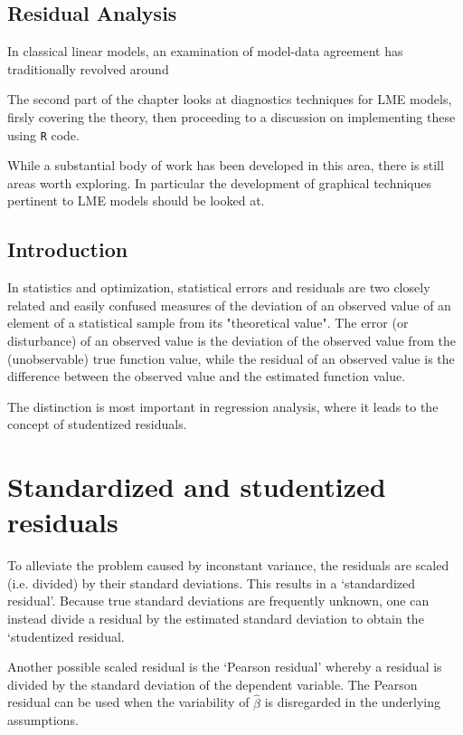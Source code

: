 \documentclass[Main.tex]{subfiles}
\begin{document}
\subsection{Residual Analysis}

In classical linear models, an examination of model-data agreement has traditionally revolved around

The second part of the chapter looks at diagnostics techniques for LME models, firsly covering the theory, then proceeding to a discussion on 
implementing these using \texttt{R} code.

While a substantial body of work has been developed in this area, there is still areas worth exploring. 
In particular the development of graphical techniques pertinent to LME models should be looked at.

	

\subsection{Introduction}
In statistics and optimization, statistical errors and residuals are two closely related and easily confused measures of the deviation of an observed value of an element of a statistical sample from its "theoretical value". The error (or disturbance) of an observed value is the deviation of the observed value from the (unobservable) true function value, while the residual of an observed value is the difference between the observed value and the estimated function value.

The distinction is most important in regression analysis, where it leads to the concept of studentized residuals.

\newpage

\section{Standardized and studentized residuals} %
To alleviate the problem caused by inconstant variance, the residuals are scaled (i.e. divided) by their standard deviations. This results in a `standardized residual'. Because true standard deviations are frequently unknown, one can instead divide a residual by the estimated standard deviation to obtain the `studentized residual. 

Another possible scaled residual is the  `Pearson residual' whereby a residual is divided by the standard deviation of the dependent variable. The Pearson residual can be used when the variability of $\hat{\beta}$ is disregarded in the underlying assumptions.
\end{document}
